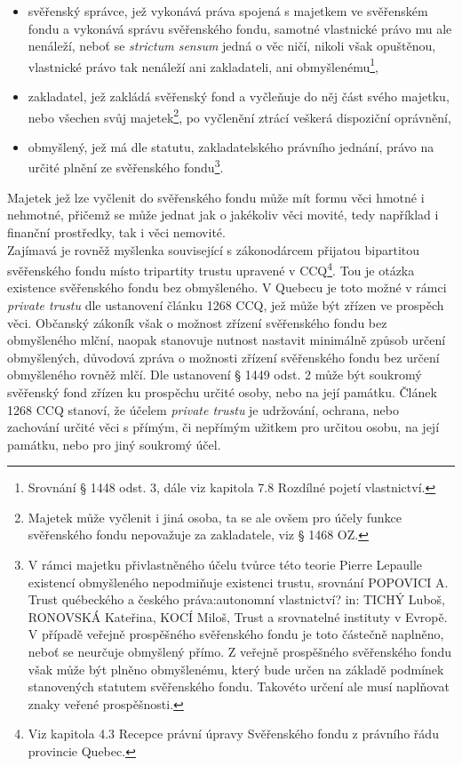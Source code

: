 \documentclass{article}
\begin{document}
\begin{itemize}
\item svěřenský správce, jež vykonává práva spojená s majetkem ve svěřenském fondu a vykonává správu svěřenského fondu, samotné vlastnické právo mu ale nenáleží, neboť se \textit{strictum sensum} jedná o věc ničí, nikoli však opuštěnou, vlastnické právo tak nenáleží ani zakladateli, ani obmyšlenému\footnote{Srovnání § 1448 odst. 3, dále viz kapitola 7.8 Rozdílné pojetí vlastnictví.},
\item zakladatel, jež zakládá svěřenský fond a vyčleňuje do něj část svého majetku, nebo všechen svůj majetek\footnote{Majetek může vyčlenit i jiná osoba, ta se ale ovšem pro účely funkce svěřenského fondu nepovažuje za zakladatele, viz § 1468 OZ.}, po vyčlenění ztrácí veškerá dispoziční oprávnění,
\item obmyšlený, jež má dle statutu, zakladatelského právního jednání, právo na určité plnění ze svěřenského fondu\footnote{V rámci majetku přivlastněného účelu tvůrce této teorie Pierre Lepaulle existencí obmyšleného nepodmiňuje existenci trustu, srovnání POPOVICI A. Trust québeckého a českého práva:autonomní vlastnictví? in: TICHÝ Luboš, RONOVSKÁ Kateřina, KOCÍ Miloš, Trust a srovnatelné instituty v Evropě. V případě veřejně prospěšného svěřenského fondu je toto částečně naplněno, neboť se neurčuje obmyšlený přímo. Z veřejně prospěšného svěřenského fondu však může být plněno obmyšlenému, který bude určen na základě podmínek stanovených statutem svěřenského fondu. Takovéto určení ale musí naplňovat znaky veřené prospěšnosti.}.	
\end{itemize}

Majetek jež lze vyčlenit do svěřenského fondu může mít formu věci hmotné i nehmotné, přičemž se může jednat jak o jakékoliv věci movité, tedy například i finanční prostředky, tak i věci nemovité.\\ 

Zajímavá je rovněž myšlenka související s zákonodárcem přijatou bipartitou svěřenského fondu místo tripartity trustu upravené v CCQ\footnote{Viz kapitola 4.3 Recepce právní úpravy Svěřenského fondu z právního řádu provincie Quebec.}. Tou je otázka existence svěřenského fondu bez obmyšleného. V Quebecu je toto možné v rámci \textit{private trustu} dle ustanovení článku 1268 CCQ, jež může být zřízen ve prospěch věci. Občanský zákoník však o možnost zřízení svěřenského fondu bez obmyšleného mlční, naopak stanovuje nutnost nastavit minimálně způsob určení obmyšlených, důvodová zpráva o možnosti zřízení svěřenského fondu bez určení obmyšleného rovněž mlčí. Dle ustanovení § 1449 odst. 2 může být soukromý svěřenský fond zřízen ku prospěchu určité osoby, nebo na její památku. Článek 1268 CCQ stanoví, že účelem \textit{private trustu} je udržování, ochrana, nebo zachování určité věci s přímým, či nepřímým užitkem pro určitou osobu, na její památku, nebo pro jiný soukromý účel.\\
\end{document}

